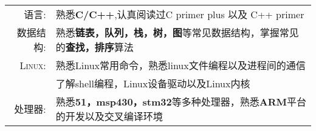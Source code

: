 %
%


 
\renewcommand{\arraystretch}{1.1}

	\begin{tabular}{>{}r>{}p{13cm}} 
		\textsc{语言:}          &  熟悉\textbf{C/C++},认真阅读过C primer plus 以及 C++ primer\\  
		\textsc{数据结构:} 		&  熟悉\textbf{链表，队列，栈，树，图}等常见数据结构，掌握常见的\textbf{查找，排序}算法 \\						   
		\textsc{Linux:}	        &  熟悉Linux常用命令，熟悉linux文件编程以及进程间的通信 \\							
								&  了解shell编程，Linux设备驱动以及Linux内核\\
		\textsc{处理器:}	    &  熟悉\textbf{51，msp430，stm32}等多种处理器，熟悉\textbf{ARM}平台的开发以及交叉编译环境\\
	\end{tabular}
	
